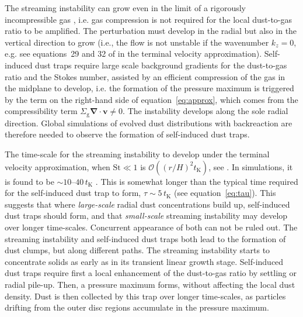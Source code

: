 \documentclass[a4paper,fleqn,usenatbib]{mnras}
\newcommand{\St}{\mathrm{St}}         %
\begin{document}
The streaming instability can grow even in the limit of a rigorously incompressible gas \citep{Youdin2005}, i.e. gas compression is not required for the local dust-to-gas ratio to be amplified. The perturbation must develop in the radial but also in the vertical direction to grow (i.e., the flow is not unstable if the wavenumber $k_z=0$, e.g. see equations~29 and 32 of \citealt{Jacquet2011} in the terminal velocity approximation). Self-induced dust traps require large scale background gradients for the dust-to-gas ratio and the Stokes number, assisted by an efficient compression of the gas in the midplane to develop, i.e. the formation of the pressure maximum is triggered by the term on the right-hand side of equation~\ref{eq:approx}, which comes from the compressibility term $\Sigma_\mathrm{g} \boldsymbol{\nabla \cdot v} \ne 0$. The instability develops along the sole radial direction. Global simulations of evolved dust distributions with backreaction are therefore needed to observe the formation of self-induced dust traps.

The time-scale for the streaming instability to develop under the terminal velocity approximation, when $\St\ll1$ is $\mathcal{O}\left((r/H)^{2}t_\mathrm{K}\right)$, see \citet{Youdin2005}. In simulations, it is found to be $\sim10$--$40\,t_\mathrm{K}$ \citep{Johansen2007b,Bai2010,Yang2014}. This is somewhat longer than the typical time required for the self-induced dust trap to form, $\tau\sim5\,t_\mathrm{K}$ (see equation~\ref{eq:tau}). This suggests that where \textit{large-scale} radial dust concentrations build up, self-induced dust traps should form, and that \textit{small-scale} streaming instability may develop over longer time-scales. Concurrent appearance of both can not be ruled out. The streaming instability and self-induced dust traps both lead to the formation of dust clumps, but along different paths. The streaming instability starts to concentrate solids as early as in its transient linear growth stage. Self-induced dust traps require first a local enhancement of the dust-to-gas ratio by settling or radial pile-up. Then, a pressure maximum forms, without affecting the local dust density. Dust is then collected by this trap over longer time-scales, as particles drifting from the outer disc regions accumulate in the pressure maximum.
\end{document}

